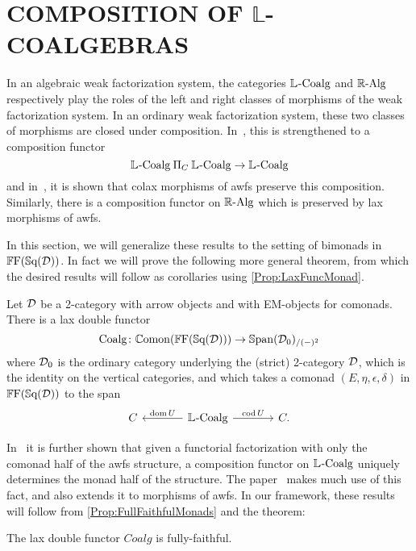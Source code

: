 
\chapter{COMPOSITION OF $\mathbb{L}$-COALGEBRAS}\label{Ch:Composition}

In an algebraic weak factorization system, the categories $\mathbb{L}_{}\text{-}\mathrm{Coalg}$ and $\mathbb{R}\text{-}\mathrm{Alg}$ respectively play the roles of the left and right classes of morphisms of the weak factorization system. In an ordinary weak factorization system, these two classes of morphisms are closed under composition. In~\cite{garner:soa}, this is strengthened to a composition functor
\[
	\mathbb{L}_{}\text{-}\mathrm{Coalg} \mathbin{\Pi}_C \mathbb{L}_{}\text{-}\mathrm{Coalg} \to \mathbb{L}_{}\text{-}\mathrm{Coalg}
\]
and in~\cite{riehl:nwfs-model}, it is shown that colax morphisms of awfs preserve this composition. Similarly, there is a composition functor on $\mathbb{R}\text{-}\mathrm{Alg}$ which is preserved by lax morphisms of awfs.

In this section, we will generalize these results to the setting of bimonads in $\mathbb{F}\mathrm{F}(\mathbb{S}\mathrm{q}(\mathcal{D}))$. In fact we will prove the following more general theorem, from which the desired results will follow as corollaries using \cref{Prop:LaxFuncMonad}.

\begin{theorem}\label{Thm:CoalgLaxFunctor}
	Let $\mathcal{D}$ be a 2-category with arrow objects and with EM-objects for comonads.
	There is a lax double functor
	\[
		\mathrm{Coalg}\colon \mathbb{C}\mathrm{omon}(\mathbb{F}\mathrm{F}(\mathbb{S}\mathrm{q}(\mathcal{D}))) \to \mathbb{S}\mathrm{pan}(\mathcal{D}_0)_{/(-)^2}
	\] 
	where $\mathcal{D}_0$ is the ordinary category underlying the (strict) 2-category $\mathcal{D}$, which is the identity on the vertical categories, and which takes a comonad $(E,\eta,\epsilon,\delta)$ in $\mathbb{F}\mathrm{F}(\mathbb{S}\mathrm{q}(\mathcal{D}))$ to the span
	\[
	\begin{tikzcd}[column sep=large]
		C & \LCoalg \lar[swap]{\dom U} \rar{\cod U} & C.
	\end{tikzcd}
	\]
\end{theorem}

In~\cite{garner:soa} it is further shown that given a functorial factorization with only the comonad half of the awfs structure, a composition functor on $\mathbb{L}_{}\text{-}\mathrm{Coalg}$ uniquely determines the monad half of the structure. The paper~\cite{riehl:nwfs-model} makes much use of this fact, and also extends it to morphisms of awfs. In our framework, these results will follow from \cref{Prop:FullFaithfulMonads} and the theorem:

\begin{theorem}\label{Thm:CoalgFullFaithful}
	The lax double functor $Coalg$ is fully-faithful.
\end{theorem}

